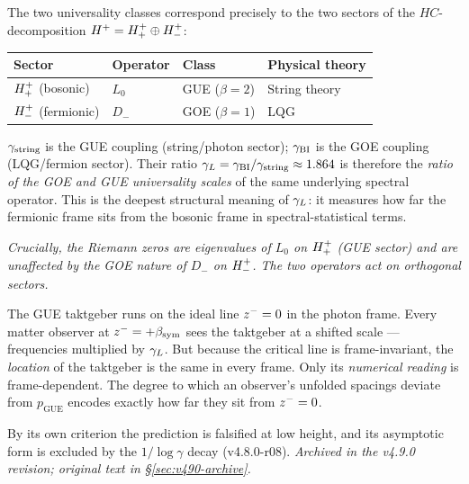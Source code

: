 \begin{remark}
\label{rem:goe-gue-string-lqg}
The two universality classes correspond precisely to the two sectors of
the $HC$-decomposition $H^+ = H^+_+\oplus H^+_-$:
\begin{center}
\renewcommand{\arraystretch}{1.3}
\begin{tabular}{llll}
\toprule
Sector & Operator & Class & Physical theory \\
\midrule
$H^+_+$ (bosonic) & $L_0$ & GUE ($\beta=2$) & String theory \\
$H^+_-$ (fermionic) & $D_-$ & GOE ($\beta=1$) & LQG \\
\bottomrule
\end{tabular}
\end{center}
$\gamma_{\mathrm{string}}$ is the GUE coupling (string/photon sector);
$\gamma_{\mathrm{BI}}$ is the GOE coupling (LQG/fermion sector).
Their ratio $\gamma_L = \gamma_{\mathrm{BI}}/\gamma_{\mathrm{string}} \approx 1.864$ is therefore the
\emph{ratio of the GOE and GUE universality scales} of the same
underlying spectral operator.
This is the deepest structural meaning of $\gamma_L$:
it measures how far the fermionic frame sits from the bosonic frame
in spectral-statistical terms.

\emph{Crucially, the Riemann zeros are eigenvalues of $L_0$ on
$H^+_+$ (GUE sector) and are unaffected by the GOE nature of
$D_-$ on $H^+_-$. The two operators act on orthogonal sectors.}
\end{remark}

\begin{remark}
The GUE taktgeber runs on the ideal line $z^-=0$ in the photon frame.
Every matter observer at $z^-=+\beta_{\mathrm{sym}}$ sees the taktgeber at a shifted
scale --- frequencies multiplied by $\gamma_L$.
But because the critical line is frame-invariant, the \emph{location} of
the taktgeber is the same in every frame.
Only its \emph{numerical reading} is frame-dependent.
The degree to which an observer's unfolded spacings deviate from
$p_{\mathrm{GUE}}$ encodes exactly how far they sit from $z^-=0$.
\end{remark}

\begin{corollary}\label{cor:odlyzko}
By its own criterion the prediction is falsified at low height, and its asymptotic form is excluded by the \(1/\log\gamma\) decay (v4.8.0-r08).
\emph{Archived in the v4.9.0 revision; original text in \S\ref{sec:v490-archive}.}
\end{corollary}

